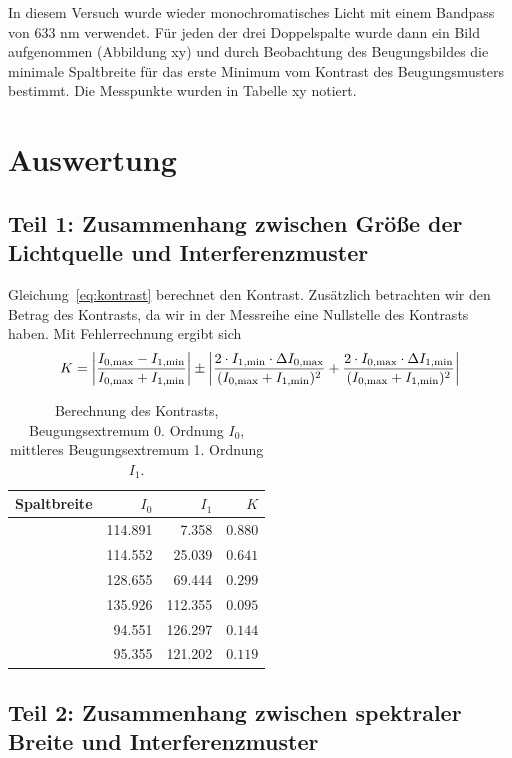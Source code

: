 \documentclass{article}
\begin{document}
In diesem Versuch wurde wieder monochromatisches Licht mit einem Bandpass von 633 nm verwendet. Für jeden der drei Doppelspalte wurde dann ein Bild aufgenommen (Abbildung xy) und durch Beobachtung des Beugungsbildes die minimale Spaltbreite für das erste Minimum vom Kontrast des Beugungsmusters bestimmt.
Die Messpunkte wurden in Tabelle xy notiert.


\section{Auswertung}



\subsection{Teil 1: Zusammenhang zwischen Größe der Lichtquelle und Interferenzmuster}

Gleichung~\eqref{eq:kontrast} berechnet den Kontrast. Zusätzlich betrachten wir den Betrag des Kontrasts, da wir in der Messreihe eine Nullstelle des Kontrasts haben. Mit Fehlerrechnung ergibt sich
\begin{align*}
K = \left|\frac{I_\text{0,max}-I_\text{1,min}}{I_\text{0,max}+I_\text{1,min}} \right| \pm \left| \frac{ 2\cdot I_{1,\text{min}} \cdot \Delta I_{0,\text{max}} }{(I_\text{0,max}+I_\text{1,\text{min}})^2}  + \frac{ 2\cdot I_{0,\text{max}} \cdot \Delta I_{1,\text{min}} }{(I_\text{0,max}+I_\text{1,min})^2} \right|
\end{align*}



\begin{table}[H]
\caption{Berechnung des Kontrasts, Beugungsextremum 0. Ordnung $I_0$, mittleres Beugungsextremum 1. Ordnung $I_1$.}
\begin{tabular}{l|rr|r}
Spaltbreite & $I_0$ & $I_1$ & $K$ \\
\hline
 & 114.891 &   7.358 & $0.880$ \\
 & 114.552 &  25.039 & $0.641$ \\
 & 128.655 &  69.444 & $0.299$ \\
 & 135.926 & 112.355 & $0.095$ \\
 & 94.551  & 126.297 & $0.144$ \\
 & 95.355 &  121.202 & $0.119$
\end{tabular}
\end{table}



\subsection{Teil 2: Zusammenhang zwischen spektraler Breite und Interferenzmuster}
\end{document}
